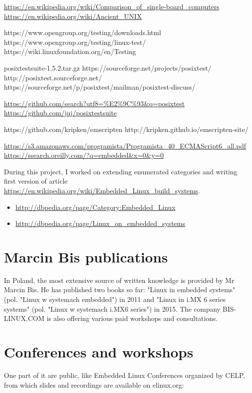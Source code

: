 \documentclass[printmode]{mgr}
\begin{document}
\url{https://en.wikipedia.org/wiki/Comparison_of_single-board_computers}
\url{https://en.wikipedia.org/wiki/Ancient_UNIX}

https://www.opengroup.org/testing/downloads.html
https://www.opengroup.org/testing/linux-test/
https://wiki.linuxfoundation.org/en/Testing

posixtestsuite-1.5.2.tar.gz
https://sourceforge.net/projects/posixtest/
http://posixtest.sourceforge.net/
https://sourceforge.net/p/posixtest/mailman/posixtest-discuss/

\url{https://github.com/search?utf8=\%E2\%9C\%93&q=posixtest}
\url{https://github.com/juj/posixtestsuite}

https://github.com/kripken/emscripten
http://kripken.github.io/emscripten-site/

\url{https://s3.amazonaws.com/programista/Programista_40_ECMAScript6_all.pdf}
\url{https://ssearch.oreilly.com/?q=embedded&x=0&y=0}

During this project, I worked on extending enumerated categories and writing first version of article \url{https://en.wikipedia.org/wiki/Embedded_Linux_build_systems}.

\begin{itemize}
  \item \url{http://dbpedia.org/page/Category:Embedded_Linux}
  \item \url{http://dbpedia.org/page/Linux_on_embedded_systems}
\end{itemize}

\section{Marcin Bis publications}

In Poland, the most extensive source of written knowledge is provided by Mr Marcin Bis.
He has published two books so far: "Linux in embedded systems" (pol. "Linux w systemach embedded") in 2011 and "Linux in i.MX 6 series systems" (pol. "Linux w systemach i.MX6 series") in 2015.
The company BIS-LINUX.COM is also offering various paid workshops and consultations.

\section{Conferences and workshops}

One part of it are public, like Embedded Linux Conferences organized by CELP, from which slides and recordings are available on elinux.org:
\end{document}
